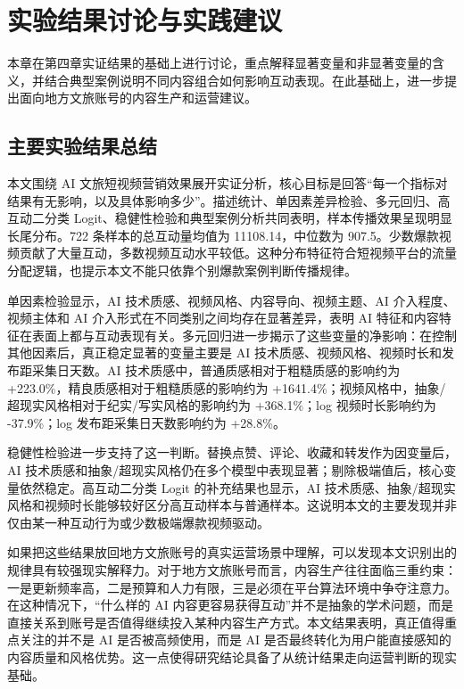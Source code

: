 \chapter{实验结果讨论与实践建议}

本章在第四章实证结果的基础上进行讨论，重点解释显著变量和非显著变量的含义，并结合典型案例说明不同内容组合如何影响互动表现。在此基础上，进一步提出面向地方文旅账号的内容生产和运营建议。

\section{主要实验结果总结}

本文围绕 AI 文旅短视频营销效果展开实证分析，核心目标是回答“每一个指标对结果有无影响，以及具体影响多少”。描述统计、单因素差异检验、多元回归、高互动二分类 Logit、稳健性检验和典型案例分析共同表明，样本传播效果呈现明显长尾分布。722 条样本的总互动量均值为 11108.14，中位数为 907.5。少数爆款视频贡献了大量互动，多数视频互动水平较低。这种分布特征符合短视频平台的流量分配逻辑，也提示本文不能只依靠个别爆款案例判断传播规律。

单因素检验显示，AI 技术质感、视频风格、内容导向、视频主题、AI 介入程度、视频主体和 AI 介入形式在不同类别之间均存在显著差异，表明 AI 特征和内容特征在表面上都与互动表现有关。多元回归进一步揭示了这些变量的净影响：在控制其他因素后，真正稳定显著的变量主要是 AI 技术质感、视频风格、视频时长和发布距采集日天数。AI 技术质感中，普通质感相对于粗糙质感的影响约为 +223.0\%，精良质感相对于粗糙质感的影响约为 +1641.4\%；视频风格中，抽象/超现实风格相对于纪实/写实风格的影响约为 +368.1\%；log 视频时长影响约为 -37.9\%；log 发布距采集日天数影响约为 +28.8\%。

稳健性检验进一步支持了这一判断。替换点赞、评论、收藏和转发作为因变量后，AI 技术质感和抽象/超现实风格仍在多个模型中表现显著；剔除极端值后，核心变量依然稳定。高互动二分类 Logit 的补充结果也显示，AI 技术质感、抽象/超现实风格和视频时长能够较好区分高互动样本与普通样本。这说明本文的主要发现并非仅由某一种互动行为或少数极端爆款视频驱动。

如果把这些结果放回地方文旅账号的真实运营场景中理解，可以发现本文识别出的规律具有较强现实解释力。对于地方文旅账号而言，内容生产往往面临三重约束：一是更新频率高，二是预算和人力有限，三是必须在平台算法环境中争夺注意力。在这种情况下，“什么样的 AI 内容更容易获得互动”并不是抽象的学术问题，而是直接关系到账号是否值得继续投入某种内容生产方式。本文结果表明，真正值得重点关注的并不是 AI 是否被高频使用，而是 AI 是否最终转化为用户能直接感知的内容质量和风格优势。这一点使得研究结论具备了从统计结果走向运营判断的现实基础。

